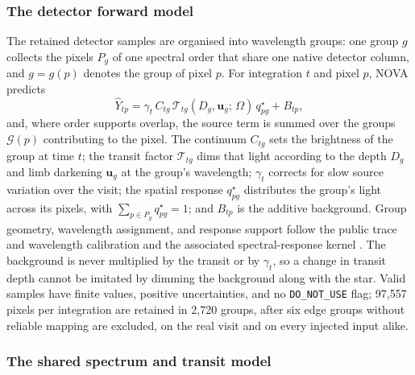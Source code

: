 \subsubsection{The detector forward model}


The retained detector samples are organised into wavelength groups: one
group $g$ collects the pixels $P_g$ of one spectral order that share one
native detector column, and $g=g(p)$ denotes the group of pixel $p$. For
integration $t$ and pixel $p$, NOVA predicts
\begin{equation}
 \widehat Y_{tp}
 = \gamma_t\, C_{tg}\,
   \mathcal{T}_{tg}(D_g, \bm{u}_g;\, \Omega)\,
   q^\star_{pg}
 + B_{tp},
 \label{eq:nova-forward}
\end{equation}
and, where order supports overlap, the source term is summed over the
groups $\mathcal{G}(p)$ contributing to the pixel. The continuum $C_{tg}$
sets the brightness of the group at time $t$; the transit factor
$\mathcal{T}_{tg}$ dims that light according to the depth $D_g$ and limb
darkening $\bm{u}_g$ at the group's wavelength; $\gamma_t$ corrects for
slow source variation over the visit; the spatial response
$q^\star_{pg}$ distributes the group's light across its pixels, with
$\sum_{p\in P_g} q^\star_{pg}=1$; and $B_{tp}$ is the additive
background. Group geometry, wavelength assignment, and response support
follow the public trace and wavelength calibration
\citep{BainesEtAl2023Trace,BainesEtAl2023Wavelength} and the associated
spectral-response kernel \citep{DarveauBernierEtAl2022,JWSTPipeline2025}.
The background is never multiplied by the transit or by $\gamma_t$, so a
change in transit depth cannot be imitated by dimming the background
along with the star. Valid samples have finite values, positive
uncertainties, and no \texttt{DO\_NOT\_USE} flag; 97{,}557 pixels per
integration are retained in 2{,}720 groups, after six edge groups without
reliable mapping are excluded, on the real visit and on every injected
input alike.

\subsubsection{The shared spectrum and transit model}

